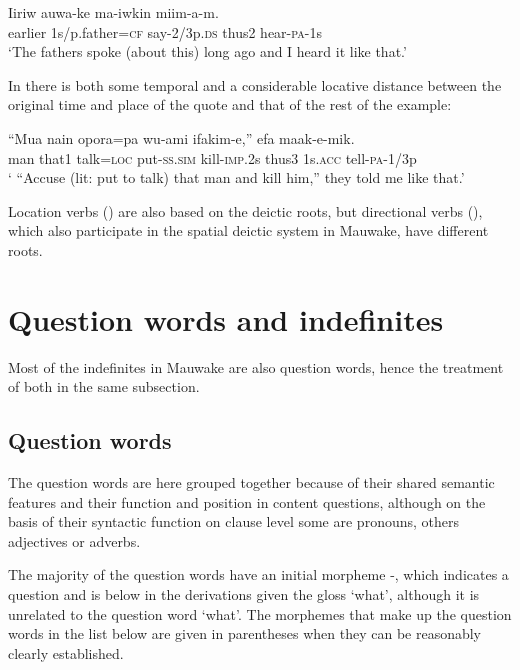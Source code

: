 \ea%
\label{ex:3:x1857}
\gll Iiriw auwa-ke ma-iwkin  miim-a-m. \\
earlier 1s/p.father=\textsc{cf} say-2/3p.\textsc{ds} thus2 hear-\textsc{pa}-1s\\
\glt`The fathers spoke (about this) long ago and I heard it like that.'
\z

In  there is both some temporal and a considerable locative distance between the original time and place of the quote and that of the rest of the example: 

\ea%
\label{ex:3:x1858}
\gll ``Mua nain opora=pa wu-ami ifakim-e,''  efa maak-e-mik.\\
man that1 talk=\textsc{loc} put-\textsc{ss}.\textsc{sim} kill-\textsc{imp}.2s thus3 1s.\textsc{acc} tell-\textsc{pa}-1/3p\\
\glt` ``Accuse (lit: put to talk) that man and kill him,'' they told me like that.'
\z

Location verbs () are also based on the deictic roots, but directional verbs (), which also participate in the spatial deictic system in Mauwake, have different roots. 

\section{Question words and indefinites}\label{sec:3:7}
{}
Most of the indefinites in Mauwake are also question words, hence the treatment of both in the same subsection.

\subsection{Question words}\label{sec:3.7.1}
{}
The question words are here grouped together because of their shared semantic features and their function and position in content questions, although on the basis of their syntactic function on clause level some are pronouns, others adjectives or adverbs. 

The majority of the question words have an initial morpheme -, which indicates a question and is below in the derivations given the gloss `what', although it is unrelated to the question word  `what'. The morphemes that make up the question words in the list below are given in parentheses when they can be reasonably clearly established. 

